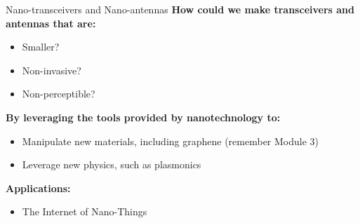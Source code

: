 \documentclass[aspectratio=169,11pt]{beamer}
\begin{document}
\begin{frame}{Nano-transceivers and Nano-antennas}
    \textbf{How could we make transceivers and antennas that are:}
    \begin{itemize}
        \item Smaller?
        \item Non-invasive?
        \item Non-perceptible?
    \end{itemize}
    
    \vspace{0.3cm}
    \textbf{By leveraging the tools provided by nanotechnology to:}
    \begin{itemize}
        \item Manipulate new materials, including graphene (remember Module 3)
        \item Leverage new physics, such as plasmonics
    \end{itemize}
    
    \vspace{0.3cm}
    \textbf{Applications:}
    \begin{itemize}
        \item The Internet of Nano-Things
    \end{itemize}
\end{frame}
\end{document}
